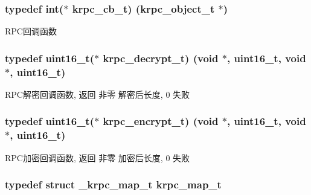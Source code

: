 \subsubsection[{krpc\+\_\+cb\+\_\+t}]{\setlength{\rightskip}{0pt plus 5cm}typedef int($\ast$ krpc\+\_\+cb\+\_\+t) ({\bf krpc\+\_\+object\+\_\+t} $\ast$)}\label{a00066_a06bb708c1b97445d3a5d0c1b32ad2ab6_a06bb708c1b97445d3a5d0c1b32ad2ab6}
R\+P\+C回调函数 \hypertarget{a00066_a5cf750f151c90f0589f68fe8c4421f1d_a5cf750f151c90f0589f68fe8c4421f1d}{}
\subsubsection[{krpc\+\_\+decrypt\+\_\+t}]{\setlength{\rightskip}{0pt plus 5cm}typedef uint16\+\_\+t($\ast$ krpc\+\_\+decrypt\+\_\+t) (void $\ast$, uint16\+\_\+t, void $\ast$, uint16\+\_\+t)}\label{a00066_a5cf750f151c90f0589f68fe8c4421f1d_a5cf750f151c90f0589f68fe8c4421f1d}
R\+P\+C解密回调函数, 返回 非零 解密后长度, 0 失败 \hypertarget{a00066_ae41a67cc07f8dff897ca978e03b1f2d7_ae41a67cc07f8dff897ca978e03b1f2d7}{}
\subsubsection[{krpc\+\_\+encrypt\+\_\+t}]{\setlength{\rightskip}{0pt plus 5cm}typedef uint16\+\_\+t($\ast$ krpc\+\_\+encrypt\+\_\+t) (void $\ast$, uint16\+\_\+t, void $\ast$, uint16\+\_\+t)}\label{a00066_ae41a67cc07f8dff897ca978e03b1f2d7_ae41a67cc07f8dff897ca978e03b1f2d7}
R\+P\+C加密回调函数, 返回 非零 加密后长度, 0 失败 \hypertarget{a00066_acc87d36519075f20746c9708a94d12d0_acc87d36519075f20746c9708a94d12d0}{}
\subsubsection[{krpc\+\_\+map\+\_\+t}]{\setlength{\rightskip}{0pt plus 5cm}typedef struct {\bf \+\_\+krpc\+\_\+map\+\_\+t} {\bf krpc\+\_\+map\+\_\+t}}\label{a00066_acc87d36519075f20746c9708a94d12d0_acc87d36519075f20746c9708a94d12d0}
\hypertarget{a00066_a8908a2b782375965d6d55fa0bfe14a8f_a8908a2b782375965d6d55fa0bfe14a8f}{}
